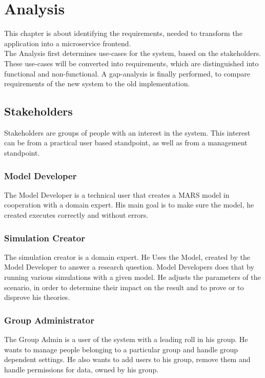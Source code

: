 
\chapter{Analysis}
This chapter is about identifying the requirements, needed to transform the application into a microservice frontend.\\
The Analysis first determines use-cases for the system, based on the stakeholders. These use-cases will be converted into requirements, which are distinguished into functional and non-functional. A gap-analysis is finally performed, to compare requirements of the new system to the old implementation. 


\section{Stakeholders}
Stakeholders are groups of people with an interest in the system. This interest can be from a practical user based standpoint, as well as from a management standpoint.

\subsection{Model Developer}
The Model Developer is a technical user that creates a MARS model in cooperation with a domain expert. His main goal is to make sure the model, he created executes correctly and without errors.

\subsection{Simulation Creator}
The simulation creator is a domain expert. He Uses the Model, created by the Model Developer to answer a research question. Model Developers does that by running various simulations with a given model. He adjusts the parameters of the scenario, in order to determine their impact on the result and to prove or to disprove his theories.

\subsection{Group Administrator}
The Group Admin is a user of the system with a leading roll in his group. He wants to manage people belonging to a particular group and handle group dependent settings. He also wants to add users to his group, remove them and handle permissions for data, owned by his group.

